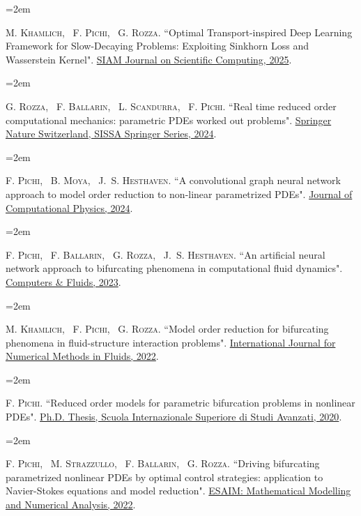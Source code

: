 \documentclass[
  usegeometry%
]{scrartcl}
\newcommand{\MarginText}[1]{\marginpar{\raggedleft\itshape\small#1}} %
\newcommand{\Description}[1]{\hangindent=2em\hangafter=0\noindent\raggedright\footnotesize{#1}\par\normalsize\vspace{1em}} %
\begin{document}
\begin{cv}{}
\Description{\MarginText{[10]}M. \textsc{Khamlich}, ~F. \textsc{Pichi}, ~G. \textsc{Rozza.} {\color{blue} ``Optimal Transport-inspired Deep Learning Framework for Slow-Decaying Problems: Exploiting Sinkhorn Loss and Wasserstein Kernel".} \href{https://epubs.siam.org/doi/10.1137/23M1604680}{SIAM Journal on Scientific Computing, 2025}.}

\Description{\MarginText{[9]}G. \textsc{Rozza}, ~F. \textsc{Ballarin}, ~L. \textsc{Scandurra}, ~F. \textsc{Pichi.} {\color{blue} ``Real time reduced order computational mechanics: parametric PDEs worked out problems".} \href{https://doi.org/10.1007/978-3-031-49892-3}{Springer Nature Switzerland, SISSA Springer Series, 2024}.}

\Description{\MarginText{[8]}F. \textsc{Pichi}, ~B. \textsc{Moya}, ~J.~S. \textsc{Hesthaven.} {\color{blue} ``A convolutional graph neural network approach to model order reduction to non-linear parametrized PDEs".} \href{https://www.sciencedirect.com/science/article/pii/S0021999124000111}{Journal of Computational Physics, 2024}.}

\Description{\MarginText{[7]}F. \textsc{Pichi}, ~F. \textsc{Ballarin}, ~G. \textsc{Rozza}, ~J.~S. \textsc{Hesthaven.} {\color{blue} ``An artificial neural network approach to bifurcating phenomena in computational fluid dynamics".} \href{https://doi.org/10.1016/j.compfluid.2023.105813}{Computers \& Fluids, 2023}.}


\Description{\MarginText{[6]}M. \textsc{Khamlich}, ~F. \textsc{Pichi}, ~G. \textsc{Rozza.} {\color{blue} ``Model order reduction for bifurcating phenomena in fluid-structure interaction problems".} \href{https://onlinelibrary.wiley.com/doi/abs/10.1002/fld.5118}{International Journal for Numerical Methods in Fluids, 2022}.}


\Description{\MarginText{[5]}F. \textsc{Pichi.} {\color{blue} ``Reduced order models for parametric bifurcation
problems in nonlinear {PDE}s".} \href{https://iris.sissa.it/handle/20.500.11767/114329}{Ph.D. Thesis, Scuola Internazionale Superiore di Studi Avanzati, 2020}.}



\Description{\MarginText{[4]}F. \textsc{Pichi}, ~M. \textsc{Strazzullo}, ~F. \textsc{Ballarin}, ~G. \textsc{Rozza.} {\color{blue} ``Driving bifurcating parametrized nonlinear PDEs by optimal control strategies: application to Navier-Stokes equations and model reduction".} \href{https://www.esaim-m2an.org/articles/m2an/abs/2022/04/m2an200206/m2an200206.html}{ESAIM: Mathematical Modelling and Numerical Analysis, 2022}.}



\end{cv}
\end{document}
